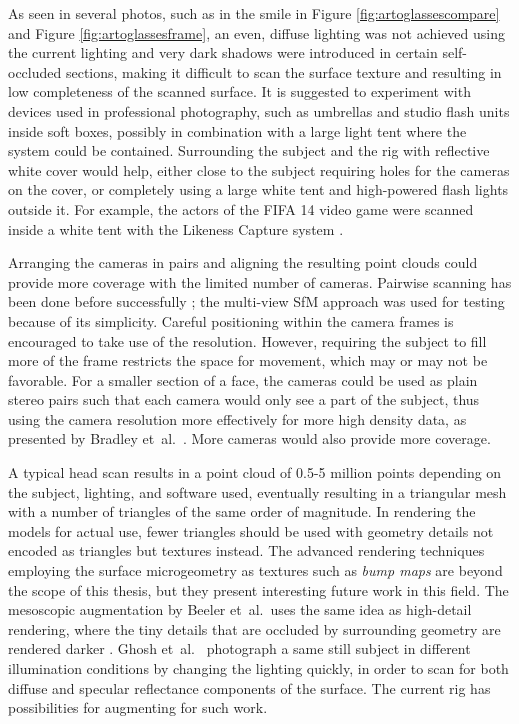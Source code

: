 As seen in several photos, such as in the smile in Figure \ref{fig:artoglassescompare} and Figure \ref{fig:artoglassesframe}, an even, diffuse lighting was not achieved using the current lighting and very dark shadows were introduced in certain self-occluded sections, making it difficult to scan the surface texture and resulting in low completeness of the scanned surface.
It is suggested to experiment with devices used in professional photography, such as umbrellas and studio flash units inside soft boxes, possibly in combination with a large light tent where the system could be contained.
Surrounding the subject and the rig with reflective white cover would help, either close to the subject requiring holes for the cameras on the cover, or completely using a large white tent and high-powered flash lights outside it.
For example, the actors of the FIFA 14 video game were scanned inside a white tent with the Likeness Capture system \cite{eafifa14,capturelab}.

Arranging the cameras in pairs and aligning the resulting point clouds could provide more coverage with the limited number of cameras.
Pairwise scanning has been done before successfully \cite{eafifa14,beeler2010high,bradley2010high};
the multi-view SfM approach was used for testing because of its simplicity.
Careful positioning within the camera frames is encouraged to take use of the resolution.
However, requiring the subject to fill more of the frame restricts the space for movement, which may or may not be favorable.
For a smaller section of a face, the cameras could be used as plain stereo pairs such that each camera would only see a part of the subject, thus using the camera resolution more effectively for more high density data, as presented by Bradley et~al.\ \cite{bradley2010high}.
More cameras would also provide more coverage.

A typical head scan results in a point cloud of 0.5-5 million points depending on the subject, lighting, and software used, eventually resulting in a triangular mesh with a number of triangles of the same order of magnitude.
In rendering the models for actual use, fewer triangles should be used with geometry details not encoded as triangles but textures instead.
The advanced rendering techniques employing the surface microgeometry as textures such as \emph{bump maps} are beyond the scope of this thesis, but they present interesting future work in this field.
The mesoscopic augmentation by Beeler et~al.\ uses the same idea as high-detail rendering, where the tiny details that are occluded by surrounding geometry are rendered darker \cite{beeler2010high}.
Ghosh et~al.\ \cite{ghosh2011multiview} photograph a same still subject in different illumination conditions by changing the lighting quickly, in order to scan for both diffuse and specular reflectance components of the surface.
The current rig has possibilities for augmenting for such work.

